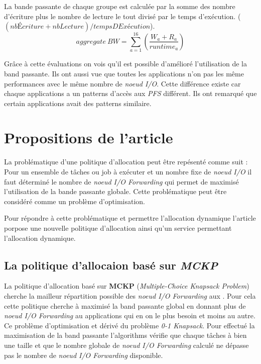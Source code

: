 \documentclass[10pt, a4paper]{article}
\begin{document}
La bande passante de chaque groupe est calculée par la somme des nombre d'écriture plus le nombre de lecture le tout divisé par le temps d'exécution. ($(nbÉcriture + nbLecture) / tempsDExécution$).
\begin{equation*}aggregate\ BW=\sum_{a=1}^{16}\left(\frac{W_{a}+R_{a}}{runtime_{a}}\right) \tag{2}\end{equation*}

Grâce à cette évaluations on vois qu'il est possible d'amélioré l'utilisation de la band passante.
Ils ont aussi vue que toutes les applications n'on pas les même performances avec le même nombre de \emph{noeud I/O}. Cette différence existe car chaque applications a un patterns d'accès aux \emph{PFS} différent. Ils ont remarqué que certain applications avait des patterns similaire.

\section{Propositions de l'article}

La problématique d'une politique d'allocation peut être repésenté comme suit :
Pour un ensemble de tâches ou job à exécuter et un nombre fixe de \emph{noeud I/O} il faut déterminé le nombre de \emph{noeud I/O Forwarding} qui permet de maximisé l'utilisation de la bande passante globale.
Cette problématique peut être considéré comme un problème d'optimisation.

Pour répondre à cette problématique et permettre l'allocation dynamique l'article porpose une nouvelle politique d'allocation ainsi qu'un service permettant l'allocation dynamique.

\subsection{La politique d'allocaion basé sur \emph{MCKP}}

La politique d'allocation basé sur \textbf{MCKP} (\emph{Multiple-Choice Knapsack Problem}) cherche la mailleur répartition possible des \emph{noeud I/O Forwarding} aux \noeudsDeCalculs{}.
Pour cela cette politique cherche à maximisé la band passante global en donnant plus de \emph{noeud I/O Forwarding} au applications qui en on le plus besoin et moins au autre. Ce problème d'optimisation et dérivé du problème \emph{0-1 Knapsack}.
Pour effectué la maximisation de la band passante l'algorithms vérifie que chaque tâches à bien une taille et que le nombre globale de \emph{noeud I/O Forwarding} calculé ne dépasse pas le nombre de \emph{noeud I/O Forwarding} disponible.
\end{document}
